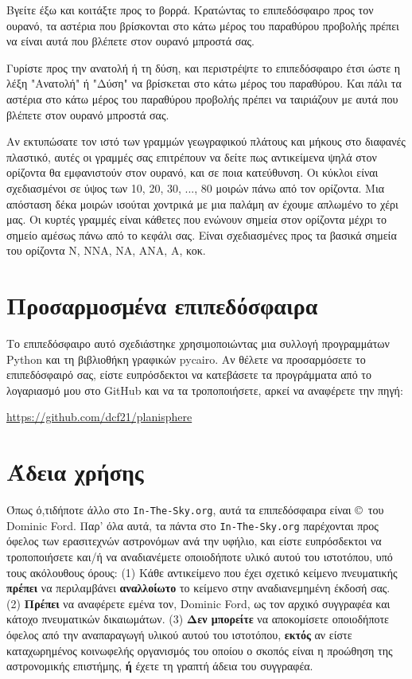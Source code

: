 \documentclass[a4paper,onecolumn,10pt]{article}
\begin{document}
Βγείτε έξω και κοιτάξτε προς το βορρά. Κρατώντας το επιπεδόσφαιρο προς τον ουρανό, τα αστέρια που 
βρίσκονται στο κάτω μέρος του παραθύρου προβολής πρέπει να είναι αυτά που βλέπετε στον ουρανό
μπροστά σας.

Γυρίστε προς την ανατολή ή τη δύση, και περιστρέψτε το επιπεδόσφαιρο έτσι ώστε η λέξη 
"Ανατολή" ή "Δύση" να βρίσκεται στο κάτω μέρος του παραθύρου. Και πάλι τα αστέρια στο 
κάτω μέρος του παραθύρου προβολής πρέπει να ταιριάζουν με αυτά που βλέπετε στον ουρανό μπροστά σας.

Αν εκτυπώσατε τον ιστό των γραμμών γεωγραφικού πλάτους και μήκους στο διαφανές πλαστικό,
αυτές οι γραμμές σας επιτρέπουν να δείτε πως αντικείμενα ψηλά στον ορίζοντα 
θα εμφανιστούν στον ουρανό, και σε ποια κατεύθυνση. 
Οι κύκλοι είναι σχεδιασμένοι σε ύψος των 10, 20, 30, ..., 80 μοιρών πάνω από τον ορίζοντα. 
Μια απόσταση δέκα μοιρών ισούται χοντρικά με μια 
παλάμη αν έχουμε απλωμένο το χέρι μας. Οι κυρτές γραμμές είναι κάθετες 
που ενώνουν σημεία στον ορίζοντα μέχρι το σημείο αμέσως πάνω από το κεφάλι σας.
Είναι σχεδιασμένες προς τα βασικά σημεία του ορίζοντα Ν, ΝΝΑ, ΝΑ, ΑΝΑ, Α, κοκ.

\section*{Προσαρμοσμένα επιπεδόσφαιρα}

Το επιπεδόσφαιρο αυτό σχεδιάστηκε χρησιμοποιώντας μια συλλογή προγραμμάτων Python και τη
βιβλιοθήκη γραφικών pycairo. Αν θέλετε να προσαρμόσετε το επιπεδόσφαιρό σας, είστε
ευπρόσδεκτοι να κατεβάσετε τα προγράμματα από το λογαριασμό μου στο GitHub και να τα τροποποιήσετε,
αρκεί να αναφέρετε την πηγή:

\url{https://github.com/dcf21/planisphere}

\section*{Άδεια χρήσης}

Όπως ό,τιδήποτε άλλο στο {\tt In-The-Sky.org}, αυτά τα επιπεδόσφαιρα είναι 
\copyright\ του Dominic Ford. Παρ' όλα αυτά, τα πάντα στο {\tt In-The-Sky.org} 
παρέχονται προς όφελος των ερασιτεχνών αστρονόμων ανά την υφήλιο, και είστε ευπρόσδεκτοι
να τροποποιήσετε και/ή να αναδιανέμετε οποιοδήποτε υλικό αυτού του ιστοτόπου, υπό τους
ακόλουθους όρους: (1) Κάθε αντικείμενο που έχει σχετικό κείμενο πνευματικής {\bf
πρέπει} να περιλαμβάνει {\bf αναλλοίωτο} το κείμενο στην αναδιανεμημένη έκδοσή σας. (2)
{\bf Πρέπει} να αναφέρετε εμένα τον, Dominic Ford, ως τον αρχικό συγγραφέα και κάτοχο 
πνευματικών δικαιωμάτων. (3) {\bf Δεν μπορείτε} να αποκομίσετε οποιοδήποτε όφελος 
από την αναπαραγωγή υλικού αυτού του ιστοτόπου, {\bf εκτός} αν είστε καταχωρημένος κοινωφελής 
οργανισμός του οποίου ο σκοπός είναι η προώθηση της αστρονομικής επιστήμης, 
{\bf ή} έχετε τη γραπτή άδεια του συγγραφέα.
\end{document}
